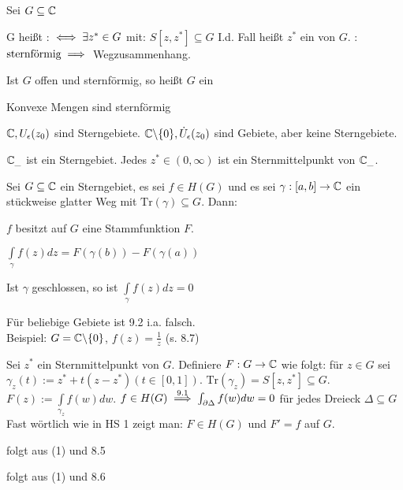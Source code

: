 \documentclass[a4paper,twoside,DIV15,BCOR12mm]{scrbook}
\def\gdw{\equizu}
\def\Tr{\text{Tr}}
\def\wegint{\ensuremath{\int\limits_\gamma}}
\def\gdw{\equizu}
\begin{document}
\begin{definition}
Sei $G \subseteq \mathbb{C}$
\begin{liste}
\item G heißt  : $\gdw \exists z^* \in G$ mit: $S[z,z^*] \subseteq G$
I.d. Fall heißt $z^*$ ein  von $G$.\newline
{}: $\text{sternförmig} \implies$ Wegzusammenhang.
\item Ist $G$ offen und sternförmig, so heißt $G$ ein 
\end{liste}
\end{definition}

\begin{beispiel}
\begin{liste}
\item Konvexe Mengen sind sternförmig
\item $\mathbb{C}, U_{\epsilon}(z_0)$ sind Sterngebiete. $\mathbb{C}\backslash\{0\}, \dot U_{\epsilon}(z_0)$ sind Gebiete, aber keine Sterngebiete.
\item $\mathbb{C}_{\_}$ ist ein Sterngebiet. Jedes $z^* \in (0,\infty)$ ist ein Sternmittelpunkt von $\mathbb{C}_{\_}$.
\end{liste}
\end{beispiel}
\begin{satz}
Sei $G \subseteq \mathbb{C}$ ein Sterngebiet, es sei $f \in H(G)$ und es sei $\gamma:[a,b] \rightarrow \mathbb{C}$ ein stückweise glatter Weg mit $\Tr (\gamma) \subseteq G$. Dann:
\begin{liste}
\item $f$ besitzt auf $G$ eine Stammfunktion $F$.
\item $\wegint f(z) dz = F(\gamma(b))-F(\gamma(a))$
\item Ist $\gamma$ geschlossen, so ist $\wegint f(z) dz = 0$
\end{liste}
\end{satz}
\begin{bemerkung}
Für beliebige Gebiete ist 9.2 i.a. falsch. \\
Beispiel: $G = \mathbb{C}\backslash\{0\}$, $f(z) = \frac{1}{z}$ (s. 8.7)
\end{bemerkung}

\begin{beweis}
\begin{liste}
\item Sei $z^*$ ein Sternmittelpunkt von $G$. Definiere $F : G \to \mathbb{C}$ wie folgt:
für $z \in G$ sei $\gamma_z (t) := z^* + t (z-z^*) (t \in [0,1])$.
$\Tr(\gamma_z) = S[z,z^*] \subseteq G$. $F(z) := \int\limits_{\gamma _z} f(w) dw$.
$f \in H(G) \stackrel{9.1}{\implies} \int_{\partial \Delta} f(w) dw = 0$ für jedes Dreieck $\Delta \subseteq G$
Fast wörtlich wie in HS 1 zeigt man: $F \in H(G)$ und $F'=f$ auf $G$.
\item folgt aus (1) und 8.5
\item folgt aus (1) und 8.6
\end{liste}
\end{beweis}
\end{document}

